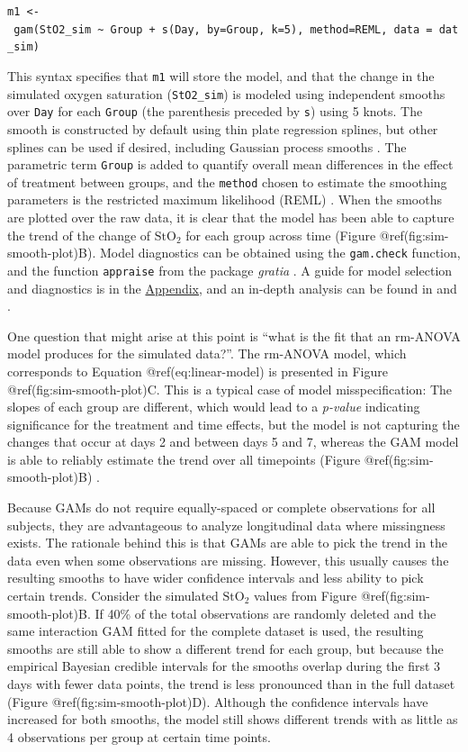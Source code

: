 \documentclass[Royal,times,sagev]{sagej}
\begin{document}
\texttt{m1\ \textless{}-\ gam(StO2\_sim\ \textasciitilde{}\ Group\ +\ s(Day,\ by=Group,\ k=5),\ method=\textquotesingle{}REML,\ data\ =\ dat\_sim)}

This syntax specifies that \texttt{m1} will store the model, and that
the change in the simulated oxygen saturation (\texttt{StO2\_sim}) is
modeled using independent smooths over \texttt{Day} for each
\texttt{Group} (the parenthesis preceded by \texttt{s}) using 5 knots.
The smooth is constructed by default using thin plate regression
splines, but other splines can be used if desired, including Gaussian
process smooths \citep{simpson2018}. The parametric term \texttt{Group}
is added to quantify overall mean differences in the effect of treatment
between groups, and the \texttt{method} chosen to estimate the smoothing
parameters is the restricted maximum likelihood (REML) \citep{wood2017}.
When the smooths are plotted over the raw data, it is clear that the
model has been able to capture the trend of the change of
\(\mbox{StO}_2\) for each group across time (Figure
@ref(fig:sim-smooth-plot)B). Model diagnostics can be obtained using the
\texttt{gam.check} function, and the function \texttt{appraise} from the
package \emph{gratia} \citep{gratia}. A guide for model selection and
diagnostics is in the \protect\hyperlink{workflow}{Appendix}, and an
in-depth analysis can be found in \citep{wood2017} and
\citep{harezlak2018}.

One question that might arise at this point is ``what is the fit that an
rm-ANOVA model produces for the simulated data?''. The rm-ANOVA model,
which corresponds to Equation @ref(eq:linear-model) is presented in
Figure @ref(fig:sim-smooth-plot)C. This is a typical case of model
misspecification: The slopes of each group are different, which would
lead to a \emph{p-value} indicating significance for the treatment and
time effects, but the model is not capturing the changes that occur at
days 2 and between days 5 and 7, whereas the GAM model is able to
reliably estimate the trend over all timepoints (Figure
@ref(fig:sim-smooth-plot)B) .

Because GAMs do not require equally-spaced or complete observations for
all subjects, they are advantageous to analyze longitudinal data where
missingness exists. The rationale behind this is that GAMs are able to
pick the trend in the data even when some observations are missing.
However, this usually causes the resulting smooths to have wider
confidence intervals and less ability to pick certain trends. Consider
the simulated \(\mbox{StO}_2\) values from Figure
@ref(fig:sim-smooth-plot)B. If 40\% of the total observations are
randomly deleted and the same interaction GAM fitted for the complete
dataset is used, the resulting smooths are still able to show a
different trend for each group, but because the empirical Bayesian
credible intervals for the smooths overlap during the first 3 days with
fewer data points, the trend is less pronounced than in the full dataset
(Figure @ref(fig:sim-smooth-plot)D). Although the confidence intervals
have increased for both smooths, the model still shows different trends
with as little as 4 observations per group at certain time points.
\end{document}
